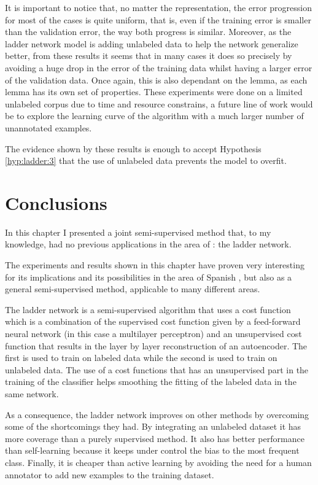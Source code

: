 It is important to notice that, no matter the representation, the error
progression for most of the cases is quite uniform, that is, even if the
training error is smaller than the validation error, the way both progress is
similar. Moreover, as the ladder network model is adding unlabeled data to help
the network generalize better, from these results it seems that in many cases
it does so precisely by avoiding a huge drop in the error of the training data
whilst having a larger error of the validation data. Once again, this is also
dependant on the lemma, as each lemma has its own set of properties. These
experiments were done on a limited unlabeled corpus due to time and resource
constrains, a future line of work would be to explore the learning curve of the
algorithm with a much larger number of unannotated examples.

The evidence shown by these results is enough to accept Hypothesis
\ref{hyp:ladder:3} that the use of unlabeled data prevents the model to
overfit.

\section{Conclusions}\label{sec:ladder:conclusions}

In this chapter I presented a joint semi-supervised method that, to my
knowledge, had no previous applications in the area of \wsd: the ladder
network.

The experiments and results shown in this chapter have proven very interesting
for its implications and its possibilities in the area of Spanish \vsd, but
also as a general semi-supervised method, applicable to many different areas.

The ladder network is a semi-supervised algorithm that uses a cost function
which is a combination of the supervised cost function given by a feed-forward
neural network (in this case a multilayer perceptron) and an unsupervised cost
function that results in the layer by layer reconstruction of an autoencoder.
The first is used to train on labeled data while the second is used to train on
unlabeled data. The use of a cost functions that has an unsupervised part in
the training of the classifier helps smoothing the fitting of the labeled data
in the same network.

As a consequence, the ladder network improves on other methods by overcoming
some of the shortcomings they had. By integrating an unlabeled dataset it has
more coverage than a purely supervised method. It also has better performance
than self-learning because it keeps under control the bias to the most frequent
class. Finally, it is cheaper than active learning by avoiding the need for a
human annotator to add new examples to the training dataset.

